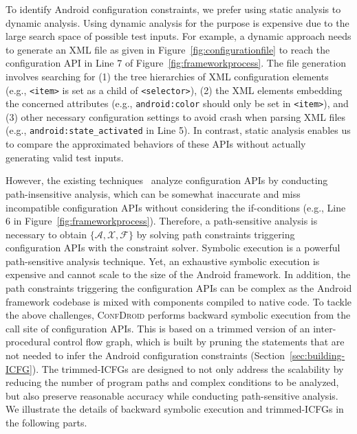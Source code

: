 To identify Android configuration constraints, we prefer using static analysis to dynamic analysis. Using dynamic analysis for the purpose is expensive due to the large search space of possible test inputs. For example, a dynamic approach needs to generate an XML file as given in Figure~\ref{fig:configurationfile} to reach the configuration API in Line 7 of Figure~\ref{fig:frameworkprocess}. The file generation involves searching for (1) the tree hierarchies of XML configuration elements (e.g., \texttt{<item>} is set as a child of \texttt{<selector>}), (2) the XML elements embedding the concerned attributes (e.g., \texttt{android:color} should only be set in \texttt{<item>}), and (3) other necessary configuration settings to avoid crash when parsing XML files (e.g., \texttt{android:state\_activated} in Line 5). In contrast, static analysis enables us to compare the approximated behaviors of these APIs without actually generating valid test inputs.
	
However, the existing techniques~\cite{rabkin2011static,behrang2015users,dong2016orplocator,chen2020understanding} analyze configuration APIs by conducting path-insensitive analysis, which can be somewhat inaccurate and miss incompatible configuration APIs without considering the if-conditions (e.g., Line 6 in Figure~\ref{fig:frameworkprocess}). Therefore, a path-sensitive analysis is necessary to obtain $\{\mathcal{A},\mathcal{X},\mathcal{F}\}$ by solving path constraints triggering configuration APIs with the constraint solver. Symbolic execution is a powerful path-sensitive analysis technique. Yet, an exhaustive symbolic execution is expensive and cannot scale to the size of the Android framework. In addition, the path constraints triggering the configuration APIs can be complex as the Android framework codebase is mixed with components compiled to native code. To tackle the above challenges, \textsc{ConfDroid} performs backward symbolic execution from the call site of configuration APIs. This is based on a trimmed version of an inter-procedural control flow graph, which is built by pruning the statements that are not needed to infer the Android configuration constraints (Section~\ref{sec:building-ICFG}). The trimmed-ICFGs are designed to not only address the scalability by reducing the number of program paths and complex conditions to be analyzed, but also preserve reasonable accuracy while conducting path-sensitive analysis. We illustrate the details of backward symbolic execution and trimmed-ICFGs in the following parts.

